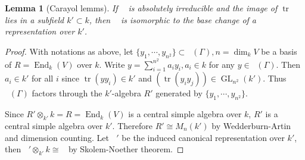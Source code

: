 \documentclass[leqno]{amsart}
\DeclareMathOperator{\GL}{GL}
\DeclareMathOperator{\mtr}{tr}
\newcommand{\1}{\mathbf{1}}
\DeclareMathOperator{\End}{End}
\DeclareMathOperator{\rrho}{\bar{\rho}}
\newtheorem{lem}[thm]{Lemma}
\theoremstyle{definition}
\theoremstyle{remark}
\begin{document}
\begin{lem}[Carayol lemms]
	If $\rrho$ is absolutely irreducible
	and the image of $\mtr\rrho$
	lies in a subfield  $k'\subset k$,
	then $\rrho$ is isomorphic 
	to the base change of 
	a representation over $k'$.
\end{lem}
\begin{proof}
	With notations as above,
	let $\{y_1,\cdots,y_{n^2}\}\subset \rrho(\Gamma),
	n=\dim_kV$
	be a basis of $R=\End_k(V)$ over $k$.
	Write $y=\sum_{i=1}^{n^2}a_iy_i,a_i\in k$
	for any $y\in \rrho(\Gamma)$.
	Then $a_i\in k'$ for all  $i$
	since  $\mtr(yy_i)\in k'$
	and  $(\mtr(y_iy_j))\in \GL_{n^2}(k')$.
	Thus $\rrho(\Gamma)$ factors through
	the  $k'$-algebra $R'$ generated by  
	$\{y_1,\cdots,y_{n^2}\}$.


	Since $R'\otimes_{k'}k=R=\End_k(V)$
	is a central simple algebra over  $k$,
	$R'$ is a central simple algebra over  $k'$.
	Therefore $R'\cong M_n(k')$
	by Wedderburn-Artin and dimension counting.
	Let $\rrho'$ be the induced canonical 
	representation over  $k'$,
	then  $\rrho'\otimes_{k'}k\cong \rrho$
	by Skolem-Noether theorem.
\end{proof}
\end{document}
